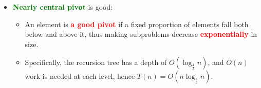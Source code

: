 \documentclass[mathserif]{beamer}
\begin{document}
{\begin{itemize}
\item  \textcolor{green}{\bf Nearly central pivot} is good: 
	\begin{itemize} 
 		\item An element is  \textcolor{red}{\bf a good pivot} if a fixed proportion of elements fall both below and above it, thus making subproblems decrease \textcolor{red}{\bf exponentially} in size.  
		\item Specifically, the recursion tree has a depth of $O(\log_{ \frac{4}{3}} n)$, and $O(n)$ work is needed at each level, hence $T(n) = O(n \log_{\frac{4}{3}} n)$. 
	\end{itemize}
\end{itemize}

}
\end{document}
